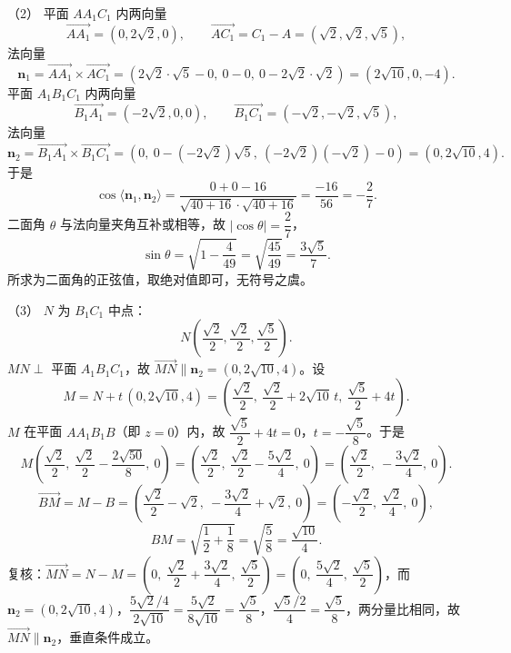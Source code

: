 \begin{answer}
（2） 平面 $AA_1C_1$ 内两向量
\nopagebreak[4]
\[\overrightarrow{AA_1}=(0,2\sqrt2,0),\qquad \overrightarrow{AC_1}=C_1-A=(\sqrt2,\sqrt2,\sqrt5),\]
法向量
\nopagebreak[4]
\[\boldsymbol n_1=\overrightarrow{AA_1}\times\overrightarrow{AC_1}=\left(2\sqrt2\cdot\sqrt5-0,\ 0-0,\ 0-2\sqrt2\cdot\sqrt2\right)=(2\sqrt{10},0,-4).\]
平面 $A_1B_1C_1$ 内两向量
\nopagebreak[4]
\[\overrightarrow{B_1A_1}=(-2\sqrt2,0,0),\qquad \overrightarrow{B_1C_1}=(-\sqrt2,-\sqrt2,\sqrt5),\]
法向量
\nopagebreak[4]
\[\boldsymbol n_2=\overrightarrow{B_1A_1}\times\overrightarrow{B_1C_1}=\left(0,\ 0-(-2\sqrt2)\sqrt5,\ (-2\sqrt2)(-\sqrt2)-0\right)=(0,2\sqrt{10},4).\]
于是
\nopagebreak[4]
\[\cos\langle\boldsymbol n_1,\boldsymbol n_2\rangle=\frac{0+0-16}{\sqrt{40+16}\cdot\sqrt{40+16}}=\frac{-16}{56}=-\frac27.\]
二面角 $\theta$ 与法向量夹角互补或相等，故 $|\cos\theta|=\dfrac27$，
\nopagebreak[4]
\[\sin\theta=\sqrt{1-\frac4{49}}=\sqrt{\frac{45}{49}}=\frac{3\sqrt5}{7}.\]
所求为二面角的正弦值，取绝对值即可，无符号之虞。

（3） $N$ 为 $B_1C_1$ 中点：
\nopagebreak[4]
\[N\left(\frac{\sqrt2}{2},\frac{\sqrt2}{2},\frac{\sqrt5}{2}\right).\]
$MN\perp$ 平面 $A_1B_1C_1$，故 $\overrightarrow{MN}\parallel\boldsymbol n_2=(0,2\sqrt{10},4)$。设
\nopagebreak[4]
\[M=N+t\,(0,2\sqrt{10},4)=\left(\frac{\sqrt2}{2},\ \frac{\sqrt2}{2}+2\sqrt{10}\,t,\ \frac{\sqrt5}{2}+4t\right).\]
$M$ 在平面 $AA_1B_1B$（即 $z=0$）内，故 $\dfrac{\sqrt5}{2}+4t=0$，$t=-\dfrac{\sqrt5}{8}$。于是
\nopagebreak[4]
\[M\left(\frac{\sqrt2}{2},\ \frac{\sqrt2}{2}-\frac{2\sqrt{50}}{8},\ 0\right)=\left(\frac{\sqrt2}{2},\ \frac{\sqrt2}{2}-\frac{5\sqrt2}{4},\ 0\right)=\left(\frac{\sqrt2}{2},\ -\frac{3\sqrt2}{4},\ 0\right).\]
\nopagebreak[4]
\[\overrightarrow{BM}=M-B=\left(\frac{\sqrt2}{2}-\sqrt2,\ -\frac{3\sqrt2}{4}+\sqrt2,\ 0\right)=\left(-\frac{\sqrt2}{2},\ \frac{\sqrt2}{4},\ 0\right),\]
\nopagebreak[4]
\[BM=\sqrt{\frac12+\frac18}=\sqrt{\frac58}=\frac{\sqrt{10}}{4}.\]
复核：$\overrightarrow{MN}=N-M=\left(0,\ \dfrac{\sqrt2}{2}+\dfrac{3\sqrt2}{4},\ \dfrac{\sqrt5}{2}\right)=\left(0,\ \dfrac{5\sqrt2}{4},\ \dfrac{\sqrt5}{2}\right)$，而 $\boldsymbol n_2=(0,2\sqrt{10},4)$，$\dfrac{5\sqrt2/4}{2\sqrt{10}}=\dfrac{5\sqrt2}{8\sqrt{10}}=\dfrac{\sqrt5}{8}$，$\dfrac{\sqrt5/2}{4}=\dfrac{\sqrt5}{8}$，两分量比相同，故 $\overrightarrow{MN}\parallel\boldsymbol n_2$，垂直条件成立。


\end{answer}
